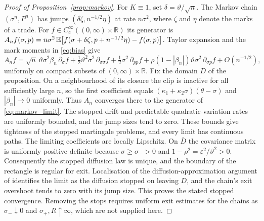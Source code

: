 \begin{proof}[Proof of Proposition~\ref{prop:markov}] For $K\equiv1$, set $\delta=\vartheta/\sqrt n$. The Markov chain $(\sigma^n,P^n)$ has jumps $(\delta\zeta,n^{-1/2}\eta)$ at rate $n\sigma^2$, where $\zeta$ and $\eta$ denote the marks of a trade. For $f\in C_c^\infty((0,\infty)\times\mathbb R)$ its generator is $A_nf(\sigma,p)=n\sigma^2\,\mathbb{E}\big[f(\sigma+\delta\zeta,p+n^{-1/2}\eta)-f(\sigma,p)\big]$. Taylor expansion and the mark moments in \eqref{eq:bias} give
\begin{equation*}
A_nf=\sqrt n\,\vartheta\sigma^2\beta_n\,\partial_\sigma f+\tfrac12\vartheta^2\sigma^2\,\partial_{\sigma\sigma}f+\tfrac12\sigma^2\,\partial_{pp}f+\rho(1-|\beta_n|)\vartheta\sigma^2\,\partial_{\sigma p}f+O(n^{-1/2}),
\end{equation*}
uniformly on compact subsets of $(0,\infty)\times\mathbb R$. Fix the domain $D$ of the proposition. On a neighbourhood of its closure the clip is inactive for all sufficiently large $n$, so the first coefficient equals $(\kappa_1+\kappa_2\sigma)(\theta-\sigma)$ and $|\beta_n|\to0$ uniformly. Thus $A_n$ converges there to the generator of \eqref{eq:markov_limit}. The stopped drift and predictable quadratic-variation rates are uniformly bounded, and the jump sizes tend to zero. These bounds give tightness of the stopped martingale problems, and every limit has continuous paths. The limiting coefficients are locally Lipschitz. On $\overline D$ the covariance matrix is uniformly positive definite because $\sigma\ge\sigma_->0$ and $1-\rho^2=\varepsilon^2/\vartheta^2>0$. Consequently the stopped diffusion law is unique, and the boundary of the rectangle is regular for exit. Localisation of the diffusion-approximation argument of \citet{EthierKurtz1986} identifies the limit as the diffusion stopped on leaving $D$, and the chain's exit overshoot tends to zero with its jump size. This proves the stated stopped convergence. Removing the stops requires uniform exit estimates for the chains as $\sigma_-\downarrow0$ and $\sigma_+,R\uparrow\infty$, which are not supplied here.
\end{proof}

